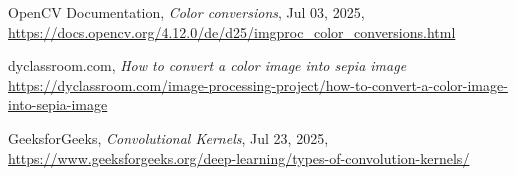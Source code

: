 \begin{thebibliography}{9}

	OpenCV Documentation,
	\textit{Color conversions}, Jul 03, 2025,
	\newline
	\url{https://docs.opencv.org/4.12.0/de/d25/imgproc_color_conversions.html}
	
	dyclassroom.com,
	\textit{How to convert a color image into sepia image}
	\newline
	\url{https://dyclassroom.com/image-processing-project/how-to-convert-a-color-image-into-sepia-image}
	
	GeeksforGeeks,
	\textit{Convolutional Kernels}, Jul 23, 2025,
	\newline
	\url{https://www.geeksforgeeks.org/deep-learning/types-of-convolution-kernels/}

\end{thebibliography}
